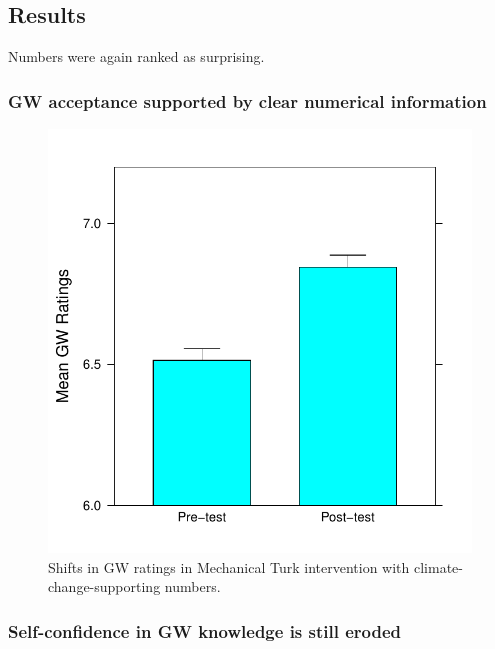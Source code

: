 \subsection{Results}

Numbers were again ranked as surprising.

\subsubsection{GW acceptance supported by clear numerical information}

\begin{figure}
    \centering
    \includegraphics{CCO-prondi-gw.pdf}
    \caption{Shifts in GW ratings in Mechanical Turk intervention with
        climate-change-supporting numbers.}
    \label{fig:prondi-gw}
\end{figure}

\subsubsection{Self-confidence in GW knowledge is still eroded}

